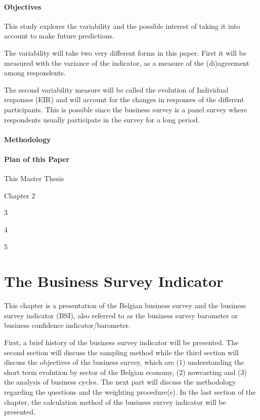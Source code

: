 \documentclass[12pt,a4paper,oneside]{book}
\begin{document}
\subsubsection{Objectives}

This study explores the variability and the possible interest of taking it into account to make future predictions.

The variability will take two very different forms in this paper. 
First it will be measured with the variance of the indicator, as a measure of the (di)agreement among respondents.

The second variability measure will be called the evolution of Individual responses (EIR) and will account for the changes in responses of the different participants. This is possible since the business survey is a panel survey where respondents usually participate in the survey for a long period.

\subsubsection{Methodology}

\subsubsection{Plan of this Paper}

This Master Thesis

Chapter 2 

3

4

5


\chapter{The Business Survey Indicator}

This chapter is a presentation of the Belgian business survey and the business survey indicator (BSI), also referred to as the business survey barometer or business confidence indicator/barometer.

First, a brief history of the business survey indicator will be presented.
The second section will discuss the sampling method while the third section will discuss the objectives of the business survey, which are (1) understanding the short term evolution by sector of the Belgian economy, (2) nowcasting and (3) the analysis of business cycles.
The next part will discuss the methodology regarding the questions and the weighting procedure(s).
In the last section of the chapter, the calculation method of the business survey indicator will be presented.
\end{document}
